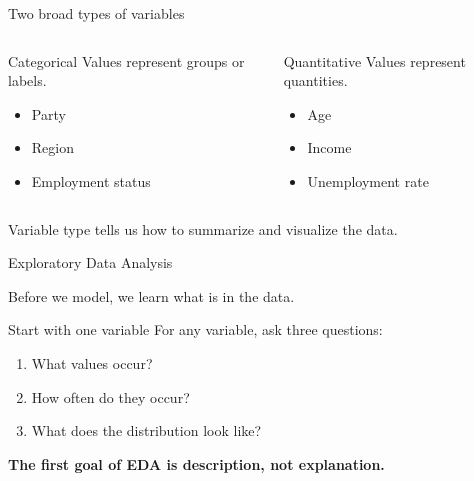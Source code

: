\documentclass[11pt,aspectratio=169]{beamer}
\newcommand{\bigquestion}[1]{%
\begin{center}
\begin{minipage}{0.88\textwidth}
\centering
\Large\color{LBJnavy}\textbf{#1}
\end{minipage}
\end{center}}
\begin{document}
\begin{frame}{Two broad types of variables}
\begin{columns}[T,onlytextwidth]
\begin{block}{Categorical}
Values represent groups or labels.
\begin{itemize}
  \item Party
  \item Region
  \item Employment status
\end{itemize}
\end{block}
\begin{block}{Quantitative}
Values represent quantities.
\begin{itemize}
  \item Age
  \item Income
  \item Unemployment rate
\end{itemize}
\end{block}
\end{columns}
\vfill
\alert{Variable type tells us how to summarize and visualize the data.}
\end{frame}

\begin{frame}[standout]
\Large Exploratory Data Analysis

\vspace{0.5em}
\normalsize
Before we model, we learn what is in the data.
\end{frame}

\begin{frame}{Start with one variable}
For any variable, ask three questions:

\vspace{0.6em}
\begin{enumerate}
  \item What \alert{values} occur?
  \item How \alert{often} do they occur?
  \item What does the \alert{distribution} look like?
\end{enumerate}
\pause
\vfill
\bigquestion{The first goal of EDA is description, not explanation.}
\end{frame}
\end{document}
